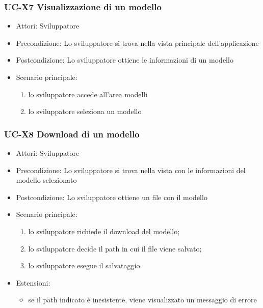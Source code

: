 		
	\subsubsection{UC-X7 Visualizzazione di un modello}
		\begin{itemize}
			\item Attori: Sviluppatore
			\item Precondizione: Lo sviluppatore si trova nella vista principale dell'applicazione
			\item Postcondizione: Lo sviluppatore ottiene le informazioni di un modello
			\item Scenario principale:
			\begin{enumerate}
				\item lo sviluppatore accede all'area modelli
				\item lo sviluppatore seleziona un modello
			\end{enumerate}
	\end{itemize}
	
	\subsubsection{UC-X8 Download di un modello}
		\begin{itemize}
			\item Attori: Sviluppatore
			\item Precondizione: Lo sviluppatore si trova nella vista con le informazioni del modello selezionato
			\item Postcondizione: Lo sviluppatore ottiene un file con il modello
			\item Scenario principale:
			\begin{enumerate}
					\item lo sviluppatore richiede il download del modello;
					\item lo sviluppatore decide il path in cui il file viene salvato;
					\item lo sviluppatore esegue il salvataggio.
				\end{enumerate}
			\item Estensioni:
				\begin{itemize}
					\item se il path indicato è inesistente, viene visualizzato un messaggio di errore
				\end{itemize}
		\end{itemize}
		

